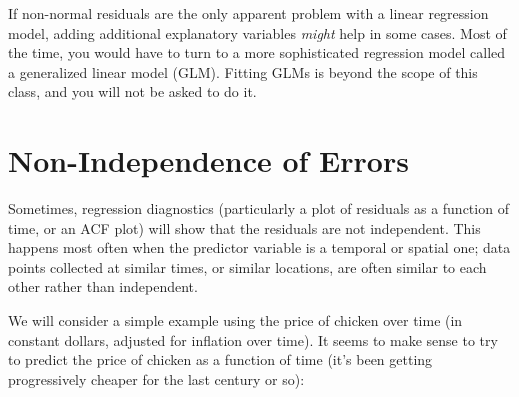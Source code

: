 \documentclass[twoside]{book}\usepackage[]{graphicx}\usepackage[]{xcolor}
\newcounter{example}[section]
\begin{document}
If non-normal residuals are the only apparent problem with a linear regression model, adding additional explanatory variables \emph{might} help in some cases.  Most of the time, you would have to turn to a more sophisticated regression model called a generalized linear model (GLM).  Fitting GLMs is beyond the scope of this class, and you will not be asked to do it.

\section{Non-Independence of Errors}
Sometimes, regression diagnostics (particularly a plot of residuals as a function of time, or an ACF plot) will show that the residuals are not independent.  This happens most often when the predictor variable is a temporal or spatial one; data points collected at similar times, or similar locations, are often similar to each other rather than independent.

We will consider a simple example using the price of chicken over time (in constant dollars, adjusted for inflation over time).  It seems to make sense to try to predict the price of chicken as a function of time (it's been getting progressively cheaper for the last century or so):
\end{document}
